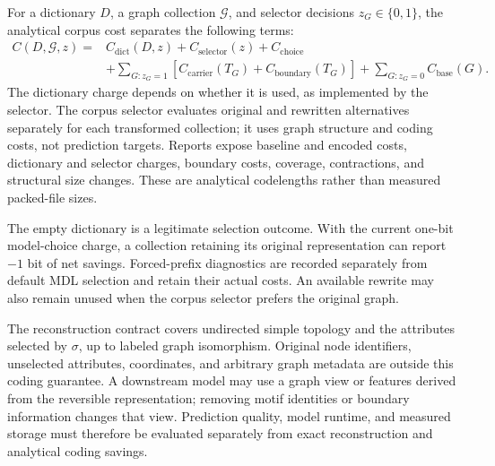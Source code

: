 For a dictionary $D$, a graph collection $\mathcal G$, and selector decisions
$z_G\in\{0,1\}$, the analytical corpus cost separates the following terms:
\begin{equation}
\begin{aligned}
C(D,\mathcal G,z)={}&C_{\mathrm{dict}}(D,z)
  +C_{\mathrm{selector}}(z)+C_{\mathrm{choice}}\\
 &+\sum_{G:z_G=1}
   \left[C_{\mathrm{carrier}}(T_G)
        +C_{\mathrm{boundary}}(T_G)\right]
  +\sum_{G:z_G=0}C_{\mathrm{base}}(G).
\end{aligned}
\label{eq:corpus-cost}
\end{equation}
The dictionary charge depends on whether it is used, as implemented by the
selector. The corpus selector evaluates original and rewritten alternatives
separately for each transformed collection; it uses graph structure and coding
costs, not prediction targets. Reports expose baseline and encoded costs,
dictionary and selector charges, boundary costs, coverage, contractions, and
structural size changes. These are analytical codelengths rather than measured
packed-file sizes.

The empty dictionary is a legitimate selection outcome. With the current
one-bit model-choice charge, a collection retaining its original representation
can report $-1$ bit of net savings. Forced-prefix diagnostics are recorded
separately from default MDL selection and retain their actual costs.
An available rewrite may also remain unused when the corpus selector prefers
the original graph.

The reconstruction contract covers undirected simple topology and the
attributes selected by $\sigma$, up to labeled graph isomorphism. Original node
identifiers, unselected attributes, coordinates, and arbitrary graph metadata
are outside this coding guarantee. A downstream model may use a graph view or
features derived from the reversible representation; removing motif identities
or boundary information changes that view. Prediction quality, model runtime,
and measured storage must therefore be evaluated separately from exact
reconstruction and analytical coding savings.

